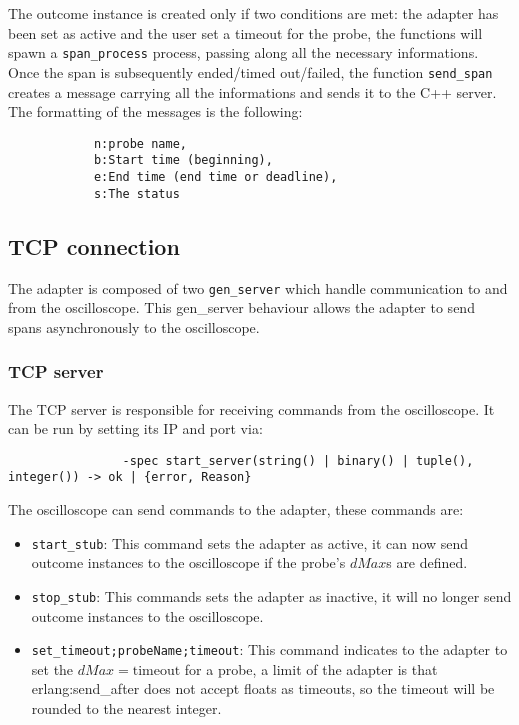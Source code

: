             The outcome instance is created only if two conditions are met: the adapter has been set as active and the user set a timeout for the probe, the functions will spawn a \texttt{span\_process} process, passing along all the necessary informations. \\
        Once the span is subsequently ended/timed out/failed, the function \texttt{send\_span} creates a message carrying all the informations and sends it to the C++ server. The formatting of the messages is the following:
        \begin{verbatim}
            n:probe name,
            b:Start time (beginning),
            e:End time (end time or deadline),
            s:The status
        \end{verbatim}

    \subsection{TCP connection}
        The adapter is composed of two \texttt{gen\_server} which handle communication to and from the oscilloscope. This gen\_server behaviour allows the adapter to send spans asynchronously to the oscilloscope.

        \subsubsection{TCP server}
            The TCP server is responsible for receiving commands from the oscilloscope. It can be run by setting its IP and port via:
            \begin{verbatim}
                -spec start_server(string() | binary() | tuple(), integer()) -> ok | {error, Reason}
            \end{verbatim}
            The oscilloscope can send commands to the adapter, these commands are:
            \begin{itemize}
                \item \texttt{start\_stub}: This command sets the adapter as active, it can now send outcome instances to the oscilloscope if the probe's $dMax$s are defined.
                \item \texttt{stop\_stub}: This commands sets the adapter as inactive, it will no longer send outcome instances to the oscilloscope.
                \item \texttt{set\_timeout;probeName;timeout}: This command indicates to the adapter to set the $dMax = \text{timeout}$ for a probe, a limit of the adapter is that erlang:send\_after does not accept floats as timeouts, so the timeout will be rounded to the nearest integer.
            \end{itemize}

